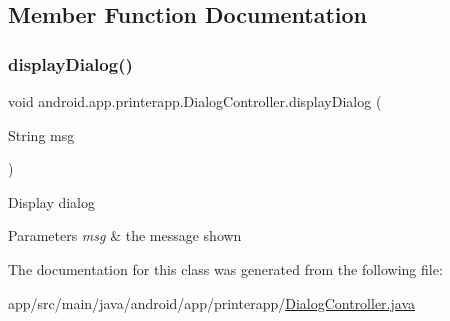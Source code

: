 \subsection{Member Function Documentation}
\mbox{\label{classandroid_1_1app_1_1printerapp_1_1_dialog_controller_a6a15c5a7684a6512bff4bf8eb23cc373}} 
\subsubsection{\texorpdfstring{display\+Dialog()}{displayDialog()}}
{\footnotesize\ttfamily void android.\+app.\+printerapp.\+Dialog\+Controller.\+display\+Dialog (\begin{DoxyParamCaption}\item[{String}]{msg }\end{DoxyParamCaption})}

Display dialog 
\begin{DoxyParams}{Parameters}
{\em msg} & the message shown \\
\hline
\end{DoxyParams}


The documentation for this class was generated from the following file\+:\begin{DoxyCompactItemize}
\item 
app/src/main/java/android/app/printerapp/\hyperlink{_dialog_controller_8java}{Dialog\+Controller.\+java}\end{DoxyCompactItemize}
